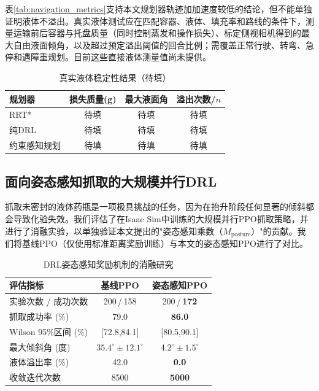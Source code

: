 表\ref{tab:navigation_metrics}支持本文规划器轨迹加加速度较低的结论，但不能单独证明液体不溢出。真实液体测试应在匹配容器、液体、填充率和路线的条件下，测量运输前后容器与托盘质量（同时控制蒸发和操作损失）、标定侧视相机得到的最大自由液面倾角，以及超过预定溢出阈值的回合比例；需覆盖正常行驶、转弯、急停和遇障重规划。目前这些直接液体测量值尚未提供。

\begin{table}[!t]
\caption{真实液体稳定性结果（待填）}
\label{tab:liquid_stability}
\centering
\begin{tabular}{lccc}
\hline\hline
\textbf{规划器} & \textbf{损失质量(g)} & \textbf{最大液面角} & \textbf{溢出次数/$n$} \\ \hline
RRT* & 待填 & 待填 & 待填 \\
纯DRL & 待填 & 待填 & 待填 \\
约束感知规划 & 待填 & 待填 & 待填 \\ \hline\hline
\end{tabular}
\end{table}

\subsection{面向姿态感知抓取的大规模并行DRL}
\label{subsec:exp_rl_grasping}

抓取未密封的液体药瓶是一项极具挑战的任务，因为在抬升阶段任何显著的倾斜都会导致化验失效。我们评估了在Isaac Sim中训练的大规模并行PPO抓取策略，并进行了消融实验，以单独验证本文提出的"姿态感知乘数（$M_{\text{posture}}$）"的贡献。我们将基线PPO（仅使用标准距离奖励训练）与本文的姿态感知PPO进行了对比。

\begin{table}[!t]
\renewcommand{\arraystretch}{1.3}
\caption{DRL姿态感知奖励机制的消融研究}
\label{tab:rl_grasping}
\centering
\begin{tabular}{lcc}
\hline\hline
\textbf{评估指标} & \textbf{基线PPO} & \textbf{姿态感知PPO} \\ \hline
实验次数 / 成功次数 & 200\,/\,158 & 200\,/\,\textbf{172} \\
抓取成功率 (\%) & 79.0 & \textbf{86.0} \\
Wilson 95\%区间 (\%) & [72.8,84.1] & [80.5,90.1] \\
最大倾斜角 (度) & $35.4^\circ \pm 12.1^\circ$ & $\mathbf{4.2^\circ \pm 1.5^\circ}$ \\
液体溢出率 (\%) & 42.0 & \textbf{0.0} \\
收敛迭代次数 & 8500 & \textbf{5000} \\ \hline\hline
\end{tabular}
\end{table}

